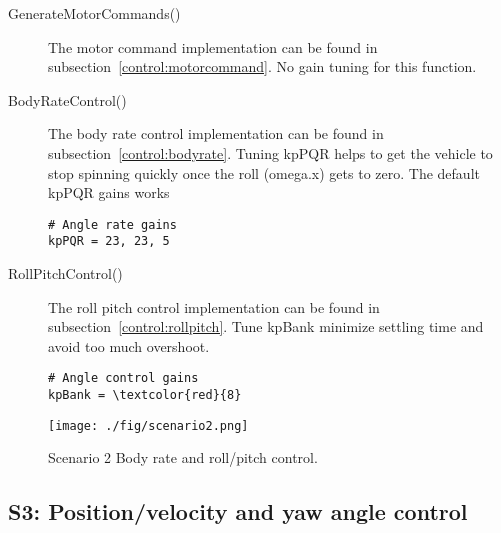 \documentclass[letterpaper]{article}
\begin{document}
\begin{description}

\item [GenerateMotorCommands()] The motor command implementation can be found in subsection~\ref{control:motorcommand}. No gain tuning for this function.

\item [BodyRateControl()] The body rate control implementation can be found in subsection~\ref{control:bodyrate}. Tuning kpPQR helps to get the vehicle to stop spinning quickly once the  roll (omega.x) gets to zero. The default kpPQR gains works
\begin{Verbatim}[frame=single]
# Angle rate gains
kpPQR = 23, 23, 5
\end{Verbatim} 

\item [RollPitchControl()] The roll pitch control implementation can be found in subsection~\ref{control:rollpitch}. Tune kpBank minimize settling time and avoid too much overshoot. 
\begin{Verbatim}[frame=single,commandchars=\\\{\}]
# Angle control gains
kpBank = \textcolor{red}{8}
\end{Verbatim} 

\end{description}



\begin{figure}[ht]
\centering
\texttt{[image: ./fig/scenario2.png]}
\caption{\label{fig:scenario2} Scenario 2 Body rate and roll/pitch control.}
\end{figure}

\subsection{S3: Position/velocity and yaw angle control}
\end{document}

